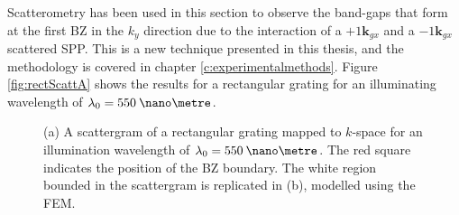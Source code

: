 Scatterometry has been used in this section to observe the band-gaps that form at the first BZ in the $k_y$ direction due to the interaction of a $+1\mathbf{k}_{gx}$ and a  $-1\mathbf{k}_{gx}$ scattered SPP. This is a new technique presented in this thesis, and the methodology is covered in chapter \ref{c:experimentalmethods}. Figure \ref{fig:rectScattA} shows the results for a rectangular grating for an illuminating wavelength of $\lambda_0=550\:\nano\metre$.
\begin{figure}
\begin{center}
\end{center}
\caption[A scattergram of a rectangular grating mapped to $k$-space for an illumination wavelength of $\lambda_0=550\:\nano\metre$.]{(a) A scattergram of a rectangular grating mapped to $k$-space for an illumination wavelength of $\lambda_0=550\:\nano\metre$. The red square indicates the position of the BZ boundary. The white region bounded in the scattergram is replicated in (b), modelled using the FEM.\label{fig:rectScatt}}
\end{figure}


